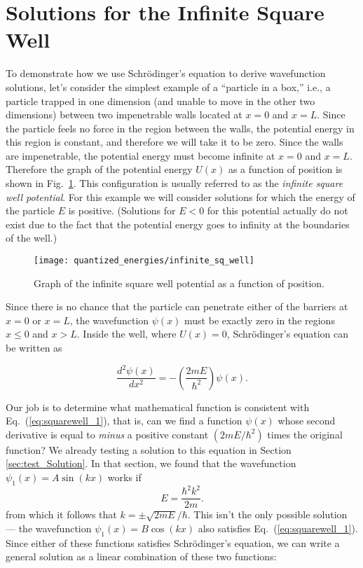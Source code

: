\section{Solutions for the Infinite Square Well}
\label{sec:Inf_Sq_Well}

To demonstrate how we use Schr\"odinger's equation to derive
wavefunction solutions, let's consider the simplest example of a
``particle in a box,'' i.e., a
particle trapped in one dimension (and unable to move in the other
two dimensions) between two impenetrable walls
located at $x = 0$ and $x = L$.  Since the particle feels no force in
the region between the walls, the potential energy in this region is
constant, and therefore we will take it to be zero.  Since the walls
are impenetrable, the potential energy must become infinite at $x = 0$
and $x = L$.  Therefore the graph of the potential energy $U(x)$ as a
function of position is shown in Fig.~\ref{fig:infinite_sq_well}.
This configuration is usually referred to as the {\it infinite square
  well potential}.  For this example we will consider solutions for
which the energy of the particle $E$ is positive. (Solutions for $E <
0$ for this potential actually do not exist due to the fact that the
potential energy goes to infinity at the boundaries of the well.)

\begin{figure}[!tb]
\begin{center}
\texttt{[image: quantized\_energies/infinite\_sq\_well]}
\end{center}
\caption{Graph of the infinite square well potential as a function of
  position.}
\label{fig:infinite_sq_well}
\end{figure}


Since there is no chance that the particle can penetrate either of the
barriers at $x = 0$ or $x = L$, the wavefunction $\psi(x)$ must be
exactly zero in the regions $x \le 0$ and $x > L$.  Inside the well,
where $U(x) = 0$, Schr\"odinger's equation can be written as

\begin{equation}
\frac{d^2\psi(x)}{dx^2}  = - \left(\frac{2mE}{\hbar^2}\right)\psi(x).
\label{eq:squarewell_1}
\end{equation}

Our job is to determine what mathematical function is consistent with
Eq.~(\ref{eq:squarewell_1}), that is, can we find a function
$\psi(x)$ whose second derivative is equal to {\it minus} a positive
constant $(2 m E/ \hbar^2)$ times the original function?  
We already testing a solution to this equation in Section 
\ref{sec:test_Solution}.
In that section, we found that the wavefunction 
$\psi_1(x) = A\sin(kx)$
works if 
\begin{equation}
\label{eq:squarewell_2}
E = \frac{\hbar^2 k^2}{2m}.
\end{equation}
from which it follows that $k = \pm\sqrt{2mE}/\hbar$. 
This isn't the only possible solution --- the wavefunction 
$\psi_1(x) = B\cos(kx)$ also satisfies Eq.~(\ref{eq:squarewell_1}).
Since either of these functions satisfies Schr\"odinger's equation, we
can write a general solution as a linear combination of these two
functions:


